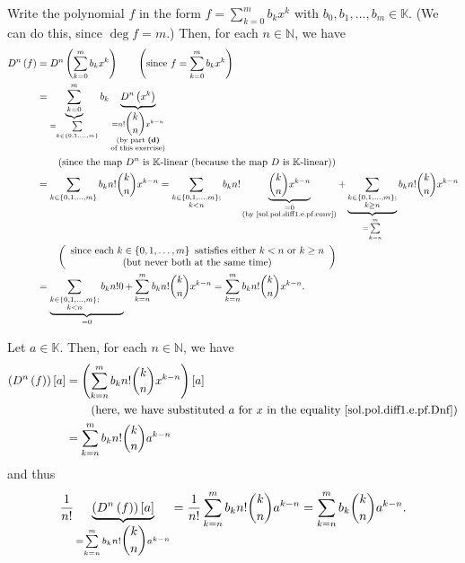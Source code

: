 \documentclass[paper=a4, fontsize=12pt]{scrartcl}%
\let\sumnonlimits\sum
\renewcommand{\sum}{\sumnonlimits\limits}
\theoremstyle{plainsl}
\theoremstyle{definition}
\theoremstyle{remark}
\begin{document}
Write the polynomial $f$ in the form $f=\sum_{k=0}^{m}b_{k}x^{k}$ with
$b_{0},b_{1},\ldots,b_{m}\in\mathbb{K}$. (We can do this, since $\deg f=m$.)
Then, for each $n\in\mathbb{N}$, we have%
\begin{align}
D^{n}\left(  f\right)   &  =D^{n}\left(  \sum_{k=0}^{m}b_{k}x^{k}\right)
\qquad\left(  \text{since }f=\sum_{k=0}^{m}b_{k}x^{k}\right) \nonumber\\
&  =\underbrace{\sum_{k=0}^{m}}_{=\sum_{k\in\left\{  0,1,\ldots,m\right\}  }%
}b_{k}\underbrace{D^{n}\left(  x^{k}\right)  }_{\substack{=n!\dbinom{k}%
{n}x^{k-n}\\\text{(by part \textbf{(d)}}\\\text{of this exercise)}%
}}\nonumber\\
&  \qquad\left(  \text{since the map }D^{n}\text{ is }\mathbb{K}\text{-linear
(because the map }D\text{ is }\mathbb{K}\text{-linear)}\right) \nonumber\\
&  =\sum_{k\in\left\{  0,1,\ldots,m\right\}  }b_{k}n!\dbinom{k}{n}x^{k-n}%
=\sum_{\substack{k\in\left\{  0,1,\ldots,m\right\}  ;\\k<n}}b_{k}%
n!\underbrace{\dbinom{k}{n}x^{k-n}}_{\substack{=0\\\text{(by
\eqref{sol.pol.diff1.e.pf.conv})}}}+\underbrace{\sum_{\substack{k\in\left\{
0,1,\ldots,m\right\}  ;\\k\geq n}}}_{=\sum_{k=n}^{m}}b_{k}n!\dbinom{k}%
{n}x^{k-n}\nonumber\\
&  \qquad\left(
\begin{array}
[c]{c}%
\text{since each }k\in\left\{  0,1,\ldots,m\right\}  \text{ satisfies either
}k<n\text{ or }k\geq n\\
\text{(but never both at the same time)}%
\end{array}
\right) \nonumber\\
&  =\underbrace{\sum_{\substack{k\in\left\{  0,1,\ldots,m\right\}
;\\k<n}}b_{k}n!0}_{=0}+\sum_{k=n}^{m}b_{k}n!\dbinom{k}{n}x^{k-n}=\sum
_{k=n}^{m}b_{k}n!\dbinom{k}{n}x^{k-n}. \label{sol.pol.diff1.e.pf.Dnf}%
\end{align}


Let $a\in\mathbb{K}$. Then, for each $n\in\mathbb{N}$, we have%
\begin{align*}
\left(  D^{n}\left(  f\right)  \right)  \left[  a\right]   &  =\left(
\sum_{k=n}^{m}b_{k}n!\dbinom{k}{n}x^{k-n}\right)  \left[  a\right] \\
&  \qquad\left(  \text{here, we have substituted }a\text{ for }x\text{ in the
equality \eqref{sol.pol.diff1.e.pf.Dnf}}\right) \\
&  =\sum_{k=n}^{m}b_{k}n!\dbinom{k}{n}a^{k-n}%
\end{align*}
and thus%
\begin{equation}
\dfrac{1}{n!}\underbrace{\left(  D^{n}\left(  f\right)  \right)  \left[
a\right]  }_{=\sum_{k=n}^{m}b_{k}n!\dbinom{k}{n}a^{k-n}}=\dfrac{1}{n!}%
\sum_{k=n}^{m}b_{k}n!\dbinom{k}{n}a^{k-n}=\sum_{k=n}^{m}b_{k}\dbinom{k}%
{n}a^{k-n}. \label{sol.pol.diff1.e.pf.3}%
\end{equation}
\end{document}

